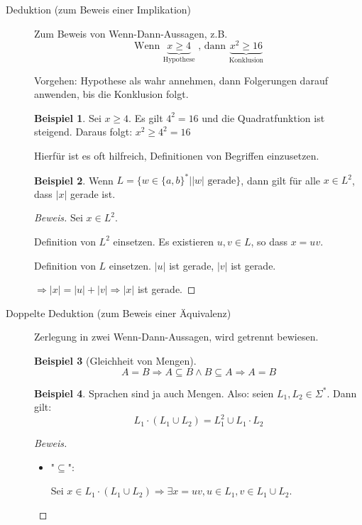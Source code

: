 \documentclass[11pt]{article} %
\theoremstyle{definition}
\newtheorem*{beispiel}{Beispiel}
\begin{document}
\begin{description}
\item[Deduktion (zum Beweis einer Implikation)] Zum Beweis von Wenn-Dann-Aussagen, z.B.
\[
\textrm{Wenn } \underbrace{x \ge 4}_{\textrm{Hypothese}}\textrm{ , dann } \underbrace{x^2\ge 16}_{\textrm{Konklusion}}
\]

Vorgehen: Hypothese als wahr annehmen, dann Folgerungen darauf anwenden, bis die Konklusion folgt.

\begin{beispiel}
Sei $x \ge 4$. Es gilt $4^2 = 16$ und die Quadratfunktion ist steigend. Daraus folgt: $x^2 \ge 4^2 = 16$
\end{beispiel}

Hierfür ist es oft hilfreich, Definitionen von Begriffen einzusetzen.
\begin{beispiel}
Wenn $L = \{ w \in \{a,b\}^* | |w| \textrm{ gerade}\}$, dann gilt für alle $x \in L^2$, dass $|x|$ gerade ist.
\end{beispiel}

\begin{proof}[Beweis]
Sei $x \in L^2$.

Definition von $L^2$ einsetzen. Es existieren $u,v \in L$, so dass $x = uv$.

Definition von $L$ einsetzen. $|u|$ ist gerade, $|v|$ ist gerade.

$\Rightarrow |x| = |u| + |v| \Rightarrow |x|$ ist gerade.
\end{proof}

\item[Doppelte Deduktion (zum Beweis einer Äquivalenz)] Zerlegung in zwei Wenn-Dann-Aussagen, wird getrennt bewiesen.

\begin{beispiel}[Gleichheit von Mengen]
\[
A = B \Rightarrow A \subseteq B \land B \subseteq A \Rightarrow A = B
\]

\end{beispiel}

\begin{beispiel}
Sprachen sind ja auch Mengen. Also: seien $L_1, L_2 \in \Sigma^*$. Dann gilt:
\[
L_1\cdot(L_1 \cup L_2) = L_1^2 \cup L_1 \cdot L_2
\]
\end{beispiel}

\begin{proof}[Beweis]
\begin{itemize}
Zweimal:
\item "$\subseteq$":

Sei $x \in L_1\cdot(L_1\cup L_2) \Rightarrow \exists x = uv, u \in L_1, v \in L_1 \cup L_2$.


\end{itemize}
\end{proof}
\end{description}
\end{document}
